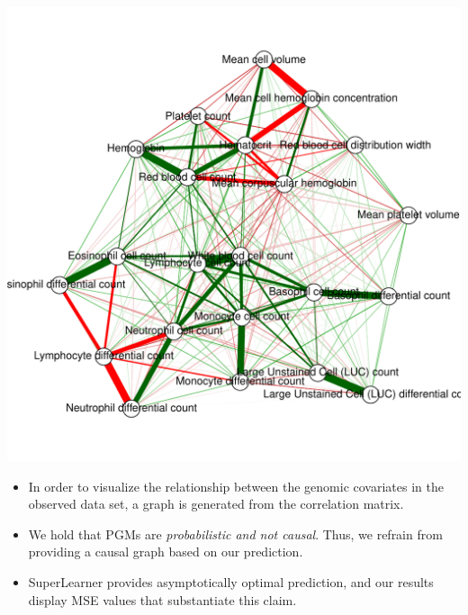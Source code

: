 \documentclass[landscape,a0paper,fontscale=0.285]{baposter} %
\begin{document}
\begin{poster}
{\begin{multicols}{2}
\begin{center}
\vspace*{-0.51cm}
\includegraphics[scale=0.285]{genes_correlationGraph.pdf}
\vspace{-1.8em}
\end{center}


\begin{itemize}
\item In order to visualize the relationship between the genomic covariates in the observed data set, a graph is generated from the correlation matrix.
\item We hold that PGMs are \textit{probabilistic and not causal}. Thus, we refrain from providing a causal graph based on our prediction.
\item SuperLearner provides asymptotically optimal prediction, and our results display MSE values that substantiate this claim.
\end{itemize}

\end{multicols}
}



\end{poster}
\end{document}
